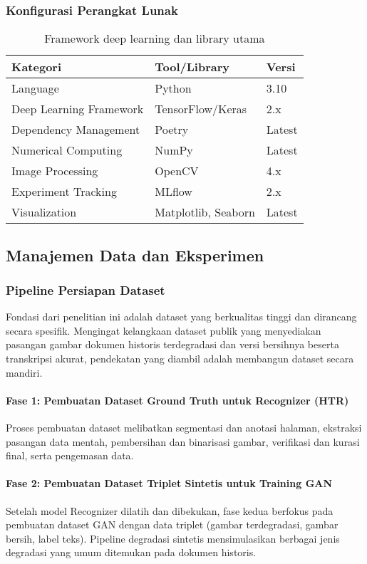 \documentclass[12pt,a4paper]{article}
\begin{document}
\subsubsection{Konfigurasi Perangkat Lunak}
\begin{table}[H]
\centering
\caption{Framework deep learning dan library utama}
\label{tab:software-framework}
\small
\begin{tabular}{|l|l|l|}
\hline
\textbf{Kategori} & \textbf{Tool/Library} & \textbf{Versi} \\ \hline
Language & Python & 3.10 \\ \hline
Deep Learning Framework & TensorFlow/Keras & 2.x \\ \hline
Dependency Management & Poetry & Latest \\ \hline
Numerical Computing & NumPy & Latest \\ \hline
Image Processing & OpenCV & 4.x \\ \hline
Experiment Tracking & MLflow & 2.x \\ \hline
Visualization & Matplotlib, Seaborn & Latest \\ \hline
\end{tabular}
\end{table}

\subsection{Manajemen Data dan Eksperimen}
\label{subsec:manajemen-data}

\subsubsection{Pipeline Persiapan Dataset}
Fondasi dari penelitian ini adalah dataset yang berkualitas tinggi dan dirancang secara spesifik. Mengingat kelangkaan dataset publik yang menyediakan pasangan gambar dokumen historis terdegradasi dan versi bersihnya beserta transkripsi akurat, pendekatan yang diambil adalah membangun dataset secara mandiri.

\paragraph{Fase 1: Pembuatan Dataset Ground Truth untuk Recognizer (HTR)}
Proses pembuatan dataset melibatkan segmentasi dan anotasi halaman, ekstraksi pasangan data mentah, pembersihan dan binarisasi gambar, verifikasi dan kurasi final, serta pengemasan data.

\paragraph{Fase 2: Pembuatan Dataset Triplet Sintetis untuk Training GAN}
Setelah model Recognizer dilatih dan dibekukan, fase kedua berfokus pada pembuatan dataset GAN dengan data triplet (gambar terdegradasi, gambar bersih, label teks). Pipeline degradasi sintetis mensimulasikan berbagai jenis degradasi yang umum ditemukan pada dokumen historis.
\end{document}
